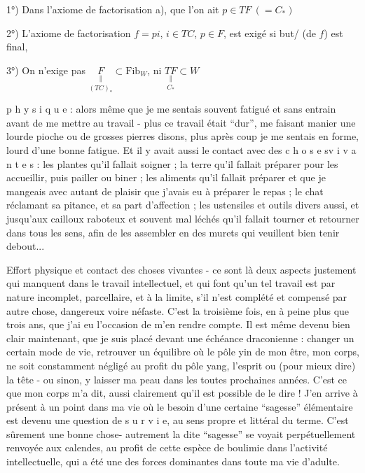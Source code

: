 1°) Dans l'axiome de factorisation a), que l'on ait $p\in TF\ (=C_*)$

2°) L'axiome de factorisation $f=pi$, $i\in TC$, $p\in F$, est exigé  si but/ (de $f$) est final,

3°) On n'exige pas $\underset{(TC)_*}{\underset{\Vert}{F}}\subset\mathrm{Fib}_W$, ni $\underset{C_*}{\underset{\Vert}{TF}}\subset W$




p h y s i q u e : alors même que je me sentais souvent fatigué et sans entrain avant de me mettre au travail - plus ce travail était ``dur'', me faisant manier une lourde pioche ou de grosses pierres disons, plus après coup je me sentais en forme, lourd d'une bonne fatigue. Et il y avait aussi le contact avec des c h o s e s\quad v i v a n t e s : les plantes qu'il fallait soigner ; la terre qu'il fallait préparer pour les accueillir, puis pailler ou biner ; les aliments qu'il fallait préparer et que je mangeais avec autant de plaisir que j'avais eu à préparer le repas ; le chat réclamant sa pitance, et sa part d'affection ; les ustensiles et outils divers aussi, et jusqu'aux cailloux raboteux et souvent mal léchés qu'il fallait tourner et retourner dans tous les sens, afin de les assembler en des murets qui veuillent bien tenir debout...

Effort physique et contact des choses vivantes - ce sont là deux aspects justement qui manquent dans le travail intellectuel, et qui font qu'un tel travail est par nature incomplet, parcellaire, et à la limite, s'il n'est complété et compensé par autre chose, dangereux voire néfaste. C'est la troisième fois, en à peine plus que trois ans, que j'ai eu l'occasion de m'en rendre compte. Il est même devenu bien clair maintenant, que je suis placé devant une échéance draconienne : changer un certain mode de vie, retrouver un équilibre où le pôle yin de mon être, mon corps, ne soit constamment négligé au profit du pôle yang, l'esprit ou (pour mieux dire) la tête - ou sinon, y laisser ma peau dans les toutes prochaines années. C'est ce que mon corps m'a dit, aussi clairement qu'il est possible de le dire ! J'en arrive à présent à un point dans ma vie où le besoin d'une certaine ``sagesse'' élémentaire est devenu une question de s u r v i e, au sens propre et littéral du terme. C'est sûrement une bonne chose- autrement la dite ``sagesse'' se voyait perpétuellement renvoyée aux calendes, au profit de cette espèce de boulimie dans l'activité intellectuelle, qui a été une des forces dominantes dans toute ma vie d'adulte.

